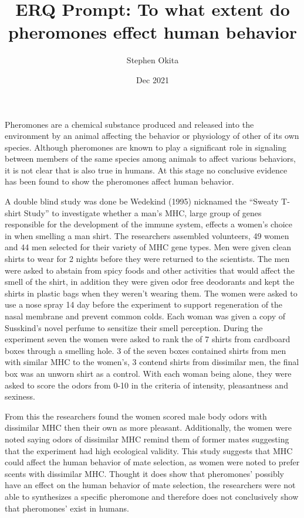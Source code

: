 \documentclass{article}
\begin{document}
\title{ERQ Prompt: To what extent do pheromones effect human behavior}
\author{Stephen Okita}
\date{Dec 2021}
\maketitle
Pheromones are a chemical substance produced and released into the environment by an animal affecting the behavior or physiology of other of its own species. Although pheromones are known to play a significant role in signaling between members of the same species among animals to affect various behaviors, it is not clear that is also true in humans. At this stage no conclusive evidence has been found to show the pheromones affect human behavior.

A double blind study was done be Wedekind (1995) nicknamed the “Sweaty T-shirt Study” to investigate whether a man's MHC, large group of genes responsible for the development of the immune system, effects a women's choice in when smelling a man shirt. The researchers assembled volunteers, 49 women and 44 men selected for their variety of MHC gene types. Men were given clean shirts to wear for 2 nights before they were returned to the scientists. The men were asked to abstain from spicy foods and other activities that would affect the smell of the shirt, in addition they were given odor free deodorants and kept the shirts in plastic bags when they weren't wearing them. The women were asked to use a nose spray 14 day before the experiment to support regeneration of the nasal membrane and prevent common colds. Each woman was given a copy of Susskind's novel perfume to sensitize their smell perception. During the experiment seven the women were asked to rank the of 7 shirts from cardboard boxes through a smelling hole. 3 of the seven boxes contained shirts from men with similar MHC to the women's, 3 contend shirts from dissimilar men, the final box was an unworn shirt as a control. With each woman being alone, they were asked to score the odors from 0-10 in the criteria of intensity, pleasantness and sexiness.

From this the researchers found the women scored male body odors with dissimilar MHC then their own as more pleasant. Additionally, the women were noted saying odors of dissimilar MHC remind them of former mates suggesting that the experiment had high ecological validity. This study suggests that MHC could affect the human behavior of mate selection, as women were noted to prefer scents with dissimilar MHC. Thought it does show that pheromones' possibly have an effect on the human behavior of mate selection, the researchers were not able to synthesizes a specific pheromone and therefore does not conclusively show that pheromones' exist in humans.
\end{document}
